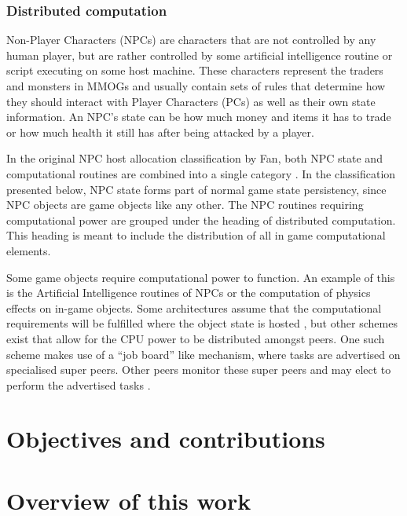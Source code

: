 \subsubsection{Distributed computation}

Non-Player Characters (NPCs) are characters that are not controlled by any human player, but are rather controlled by some artificial intelligence
routine or script executing on some host machine. These characters represent the traders and monsters in MMOGs and usually contain sets of rules that
determine how they should interact with Player Characters (PCs) as well as their own state information. An NPC's state can be how much money and
items it has to trade or how much health it still has after being attacked by a player.

In the original NPC host allocation classification by Fan, both NPC state and computational routines are combined into a single category
\cite{Fan_phd}. In the classification presented below, NPC state forms part of normal game state persistency, since NPC objects are game objects like
any other. The NPC routines requiring computational power are grouped under the heading of distributed computation. This heading is meant to include
the distribution of all in game computational elements.

Some game objects require computational power to function. An example of this is the Artificial Intelligence routines of NPCs or the computation of
physics effects on in-game objects. Some architectures assume that the computational requirements will be fulfilled where the object state is hosted
\cite{solipsis}, but other schemes exist that allow for the CPU power to be distributed amongst peers. One such scheme makes use of a ``job board''
like mechanism, where tasks are advertised on specialised super peers. Other peers monitor these super peers and may elect to perform the advertised
tasks \cite{fan_mediator_paper}.

\section{Objectives and contributions}
\label{objectives}


\section{Overview of this work}
\label{overview_intro}
